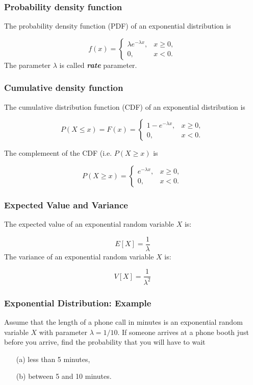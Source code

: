 \begin{frame}[fragile]
\frametitle{Probability density function}
The probability density function (PDF) of an exponential distribution is

\[
f(x) = \begin{cases}
\lambda e^{-\lambda x}, & x \ge 0, \\
0, & x < 0.
\end{cases}\]
The parameter $\lambda$  is called \textbf{\emph{rate}} parameter.
\end{frame}

\begin{frame}[fragile]
\frametitle{Cumulative density function}
The cumulative distribution function (CDF) of an exponential distribution is

\[
P(X \leq x) = F(x) = \begin{cases}
1-e^{-\lambda x}, & x \ge 0, \\
0, & x < 0.
\end{cases}\]


The complemeent of the CDF (i.e. $P(X \geq x)$ is

\[
P(X \geq x) = \begin{cases}
e^{-\lambda x}, & x \ge 0, \\
0, & x < 0.
\end{cases}\]
\end{frame}

\begin{frame}[fragile]
\frametitle{Expected Value and Variance}
The expected value of an exponential random variable $X$ is:

\[
E[X] = \frac{1}{\lambda}\]
The variance of an exponential random variable $X$ is:

\[
V[X] = \frac{1}{\lambda^2}\]

\end{frame}

\begin{frame}[fragile]
\frametitle{Exponential Distribution: Example}
Assume that the length of a phone call in minutes is an exponential random variable $X$ with parameter
$\lambda = 1/10$. If someone arrives at a phone booth just before you arrive, find the probability that you
will have to wait \begin{itemize}
\item[(a)] less than 5 minutes,
\item[(b)] between 5 and 10 minutes.
\end{itemize}
\end{frame}



